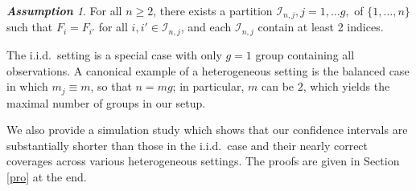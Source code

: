 \documentclass[12pt]{article}
\theoremstyle{remark}
\newtheorem{assumption}{\textbf{Assumption}}
\begin{document}
\begin{assumption}\label{ass:pair}
	For all $n\geq 2$, there exists a partition  $\mathcal{I}_{n,j}, j=1, \ldots g,$ of $\{1,\ldots,n\}$  such that $F_{i} = F_{i'}$ for all $i, i' \in \mathcal{I}_{n,j}$, and each $\mathcal{I}_{n,j}$ contain at least 2 indices. %
\end{assumption}
\noindent %
The i.i.d.\ setting is a special case with only $g=1$ group containing all observations. A canonical example of a heterogeneous setting is the balanced case in which $m_j \equiv m$, so that $n = mg$; in particular, $m$ can be $2$, which yields the maximal number of groups in our setup. %
 
We also provide a simulation study which shows that our confidence intervals are substantially  shorter than those in the i.i.d.\ case and their nearly correct coverages  across various heterogeneous settings. The proofs are given in Section \ref{pro} at the end. 
\end{document}
